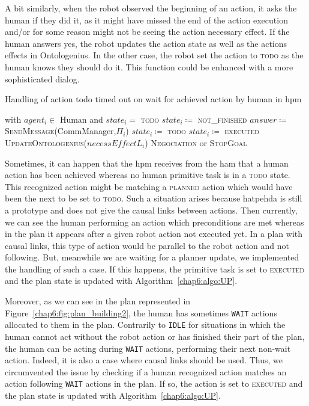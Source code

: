 \documentclass[a4paper,11pt,twoside]{StyleThese}
\begin{document}
A bit similarly, when the robot observed the beginning of an action, it asks the human if they did it, as it might have missed the end of the action execution and/or for some reason might not be seeing the action necessary effect. If the human answers yes, the robot updates the action state as well as the actions effects in Ontologenius. In the other case, the robot set the action to \textsc{todo} as the human knows they should do it. This function could be enhanced with a more sophisticated dialog. 
			
\begin{algorithm}[!htb]
	\caption{Handling of action todo timed out on wait for achieved action by human in \acrshort{hpm}}
	\label{chap6:algo:h_todo_conting_2}
	\begin{algorithmic}
		 with $agent_i \in$ Human and $state_i=$ \textsc{todo}
			\State $state_i\coloneqq$ \textsc{not\_finished} 
			\State $answer \coloneqq$ \textsc{SendMessage}(CommManager,$\Pi_i$)
				\State $state_i\coloneqq$ \textsc{todo} 
			\Else
				\State $state_i\coloneqq$ \textsc{executed} 
				\State \textsc{UpdateOntologenius($necessEffectL_i$)}
			\EndIf
		\Else
			\State \textsc{Negociation} or \textsc{StopGoal}
		\EndIf
		\EndFunction
	\end{algorithmic}
\end{algorithm}		

Sometimes, it can happen that the \acrshort{hpm} receives from the \acrshort{ham} that a human action has been achieved whereas no human primitive task is in a \textsc{todo} state. This recognized action might be matching a \textsc{planned} action which would have been the next to be set to \textsc{todo}. Such a situation arises because \acrshort{hatpehda} is still a prototype and does not give the causal links between actions. Then currently, we can see the human performing an action which preconditions are met whereas in the plan it appears after a given robot action not executed yet. In a plan with causal links, this type of action would be parallel to the robot action and not following. But, meanwhile we are waiting for a planner update, we implemented the handling of such a case. If this happens, the primitive task is set to \textsc{executed} and the plan state is updated with Algorithm~\ref{chap6:algo:UP}.

Moreover, as we can see in the plan represented in Figure~\ref{chap6:fig:plan_building2}, the human has sometimes \verb'WAIT' actions allocated to them in the plan. Contrarily to \verb'IDLE' for situations in which the human cannot act without the robot action or has finished their part of the plan, the human can be acting during \verb'WAIT' actions, performing their next non-wait action. Indeed, it is also a case where causal links should be used. Thus, we circumvented the issue by checking if a human recognized action matches an action following \verb'WAIT' actions in the plan. If so, the action is set to \textsc{executed} and the plan state is updated with Algorithm~\ref{chap6:algo:UP}.
\end{document}
